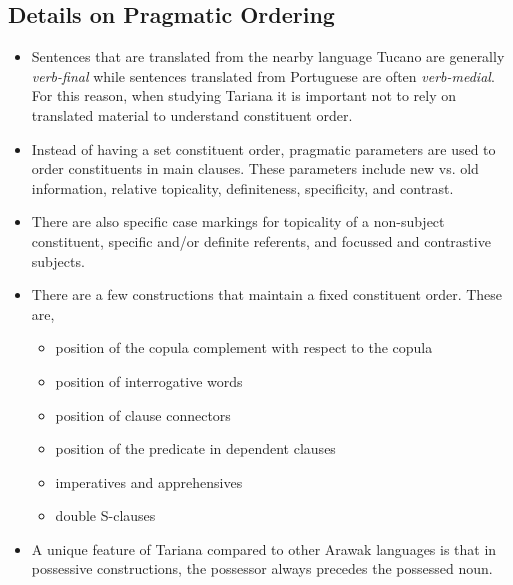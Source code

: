 \documentclass[12pt]{article}
\begin{document}
\subsection{Details on Pragmatic Ordering}
\begin{itemize}
  \item Sentences that are translated from the nearby language Tucano are generally \textit{verb-final} while sentences translated from Portuguese are often \textit{verb-medial}. For this reason, when studying Tariana it is important not to rely on translated material to understand constituent order.

  \item Instead of having a set constituent order, pragmatic parameters are used to order constituents in main clauses. These parameters include new vs. old information, relative topicality, definiteness, specificity, and contrast.

  \item There are also specific case markings for topicality of a non-subject constituent, specific and/or definite referents, and focussed and contrastive subjects.


  \item There are a few constructions that maintain a fixed constituent order. These are,
  \begin{itemize}
    \item position of the copula complement with respect to the copula
    \item position of interrogative words
    \item position of clause connectors
    \item position of the predicate in dependent clauses
    \item imperatives and apprehensives
    \item double S-clauses
  \end{itemize}

  \item A unique feature of Tariana compared to other Arawak languages is that in possessive constructions, the possessor always precedes the possessed noun.

\end{itemize}
\end{document}
